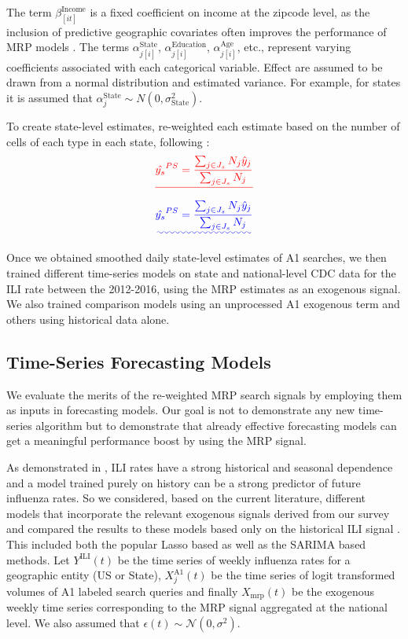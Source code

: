 \documentclass[fleqn,10pt]{wlscirep}
\providecommand{\DIFadd}[1]{{\protect\color{blue}\uwave{#1}}} %
\providecommand{\DIFdel}[1]{{\protect\color{red}\sout{#1}}}                      %
\providecommand{\DIFaddbegin}{} %
\providecommand{\DIFaddend}{} %
\providecommand{\DIFdelbegin}{} %
\providecommand{\DIFdelend}{} %
\begin{document}
The term $\beta_{[it]}^{\text{Income}}$ is a fixed coefficient on income at the zipcode level, as the inclusion of predictive geographic covariates often improves the performance of MRP models \cite{buttice_and_highton_2013}. The terms $\alpha_{j[i]}^{\text{State}}$,  $\alpha_{j[i]}^{\text{Education}}$,  $\alpha_{j[i]}^{\text{Age}}$, etc., represent varying coefficients associated with each categorical variable. Effect are assumed to be drawn from a normal distribution and estimated variance. For example, for states it is assumed that $\alpha_j^{\text{State}} \sim  N (0, \sigma_{\text{State}}^2)$.  

To create state-level estimates, re-weighted each estimate based on the number of cells of each type in each state, following \cite{wang2015forecasting}:
\DIFdelbegin \begin{eqnarray*}
\DIFdel{\hat{y_s}^{PS} = 
\frac{ \sum_{ j \in J_s } N_j \hat{y}_j }{\sum_{ j \in J_s } N_j}
}\end{eqnarray*}
\DIFdelend \DIFaddbegin \begin{equation}
\DIFadd{\hat{y_s}^{PS} = 
\frac{ \sum_{ j \in J_s } N_j \hat{y}_j }{\sum_{ j \in J_s } N_j}
}\end{equation}
\DIFaddend 

Once we obtained smoothed daily state-level estimates of A1 searches, we then trained different time-series models on state and national-level CDC data for the ILI rate between the 2012-2016, using the MRP estimates as an exogenous signal. We also trained comparison models using an unprocessed A1 exogenous term and others using historical data alone. 

\subsection*{Time-Series Forecasting Models}

We evaluate the merits of the re-weighted MRP search signals by employing them as inputs in forecasting models. Our goal is not to demonstrate any new time-series algorithm but to demonstrate that already effective forecasting models can get a meaningful performance boost by using the MRP signal. 

As demonstrated in \cite{lazer_etal_2014}, ILI rates have a strong historical and seasonal dependence and a model trained purely on history can be a strong predictor of future influenza rates. So we considered, based on the current literature, different models that incorporate the relevant exogenous signals derived from our survey and compared the results to these models based only on the historical ILI signal \cite{yang_etal_2015}. This included both the popular Lasso based \cite{yang_etal_2015} as well as the SARIMA based methods. Let $Y^{\text{ILI}}(t)$ be the time series of weekly influenza rates for a geographic entity (US or State), $X_j^{\text{A1}}(t)$ be the time series of logit transformed volumes of A1 labeled search queries and finally $X_{\text{mrp}}(t)$ be the exogenous weekly time series corresponding to the MRP signal aggregated at the national level. We also assumed that $\epsilon(t) \sim \mathcal{N}(0,\sigma^2)$. 
\end{document}

